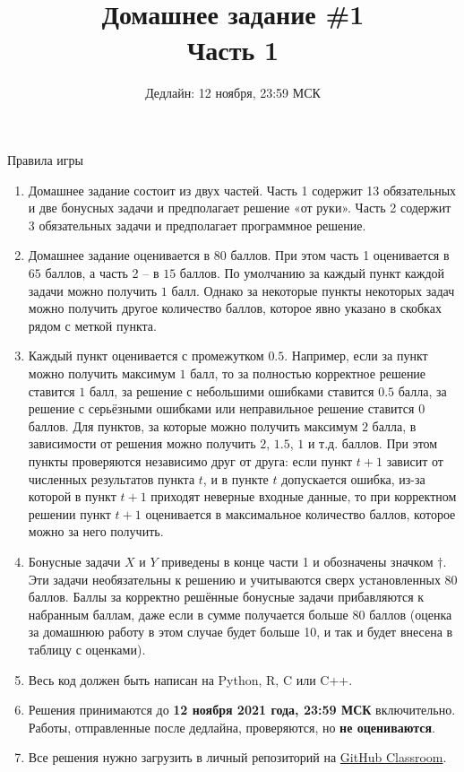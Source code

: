 \documentclass[10pt, a4paper]{extarticle}
\title{\vspace{-2em}{\normalsize Прикладная статистика в машинном обучении} \\\vspace{0.5em} Домашнее задание \#1 \vspace{0.2em}\\ \Large Часть 1}
\author{Дедлайн: 12 ноября, 23:59 МСК}
\date{\rule{15cm}{0.4pt}}
\begin{document}
	
	\maketitle
	
	\vspace{-2em}
	\begin{rulesbox}{Правила игры}
		\begin{enumerate}
			\item Домашнее задание состоит из двух частей. Часть 1 содержит 13 обязательных и две бонусных задачи и предполагает решение «от руки». Часть 2 содержит 3 обязательных задачи и предполагает программное решение.
			\item Домашнее задание оценивается в $80$ баллов. При этом часть 1 оценивается в $65$ баллов, а часть 2 – в $15$ баллов. По умолчанию за каждый пункт каждой задачи можно получить $1$ балл. Однако за некоторые пункты некоторых задач можно получить другое количество баллов, которое явно указано в скобках рядом с меткой пункта.
			\item Каждый пункт оценивается с промежутком $0.5$. Например, если за пункт можно получить максимум $1$ балл, то за полностью корректное решение ставится $1$ балл, за решение с небольшими ошибками ставится $0.5$ балла, за решение с серьёзными ошибками или неправильное решение ставится $0$ баллов. Для пунктов, за которые можно получить максимум $2$ балла, в зависимости от решения можно получить $2$, $1.5$, $1$ и т.д. баллов. При этом пункты проверяются независимо друг от друга: если пункт $t+1$ зависит от численных результатов пункта $t$, и в пункте $t$ допускается ошибка, из-за которой в пункт $t+1$ приходят неверные входные данные, то при корректном решении пункт $t+1$ оценивается в максимальное количество баллов, которое можно за него получить.
			\item Бонусные задачи $X$ и $Y$ приведены в конце части 1 и обозначены значком $\dagger$. Эти задачи необязательны к решению и учитываются сверх установленных $80$ баллов. Баллы за корректно решённые бонусные задачи прибавляются к набранным баллам, даже если в сумме получается больше $80$ баллов (оценка за домашнюю работу в этом случае будет больше 10, и так и будет внесена в таблицу с оценками).
			\item Весь код должен быть написан на Python, R, C или C++.
			\item Решения принимаются до \textbf{12 ноября 2021 года, 23:59 МСК} включительно.
			Работы, отправленные после дедлайна, проверяются, но \textbf{не оцениваются}.
			\item Все решения нужно загрузить в личный репозиторий на \href{https://classroom.github.com/a/KZaAKjaA}{GitHub Classroom}.

\end{enumerate}
\end{rulesbox}
\end{document}
